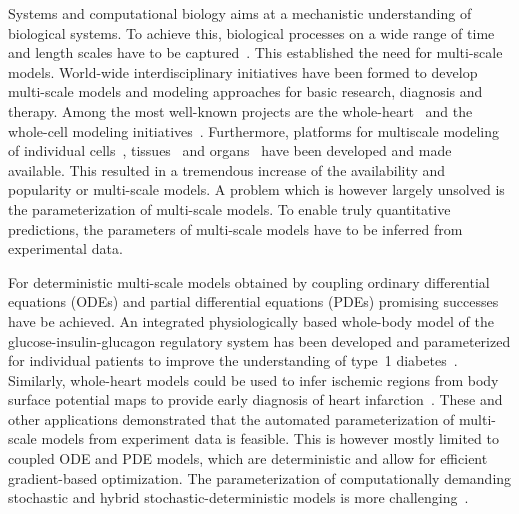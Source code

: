 \documentclass[10pt,letterpaper]{article}
\begin{document}
Systems and computational biology aims at a mechanistic understanding of biological systems. To achieve this, biological processes on a wide range of time and length scales have to be captured~\cite{HunterBor2003}. This established the need for multi-scale models. World-wide interdisciplinary initiatives have been formed to develop multi-scale models and modeling approaches for basic research, diagnosis and therapy. Among the most well-known projects are the whole-heart~\cite{HunterBor2003,Nobel2002,Trayanova2011} and the whole-cell modeling initiatives~\cite{TomitaHas1999,KarrSan2012}. Furthermore, platforms for multiscale modeling of individual cells~\cite{StilesBar2001,SchaffFin1997}, tissues~\cite{RichmondWal2010,SwatTho2012,StarrussBac2014} and organs~\cite{MiramsArt2013} have been developed and made available. This resulted in a tremendous increase of the availability and popularity or multi-scale models. A problem which is however largely unsolved is the parameterization of multi-scale models. To enable truly quantitative predictions, the parameters of multi-scale models have to be inferred from experimental data.

For deterministic multi-scale models obtained by coupling ordinary differential equations (ODEs) and partial differential equations (PDEs) promising successes have be achieved. An integrated physiologically based whole-body model of the glucose-insulin-glucagon regulatory system has been developed and parameterized for individual patients to improve the understanding of type~1 diabetes~\cite{SchallerWil2013}. Similarly, whole-heart models could be used to infer ischemic regions from body surface potential maps to provide early diagnosis of heart infarction~\cite{NielsenLys2013}. These and other applications demonstrated that the automated parameterization of multi-scale models from experiment data is feasible. This is however mostly limited to coupled ODE and PDE models, which are deterministic and allow for efficient gradient-based optimization. The parameterization of computationally demanding stochastic and hybrid stochastic-deterministic models is more challenging~\cite{AdraKir2011,KarrWil2015}.
\end{document}
